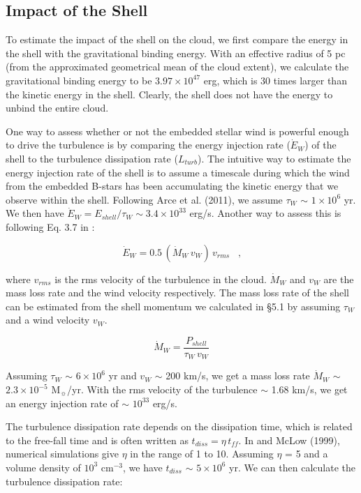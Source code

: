 \documentclass[11pt,a4paper]{emulateapj}
\begin{document}
\subsection{Impact of the Shell}
To estimate the impact of the shell on the cloud, we first compare the energy in the shell with the gravitational binding energy. With an effective radius of 5 pc (from the approximated geometrical mean of the cloud extent), we calculate the gravitational binding energy to be $3.97\times10^{47}$ erg, which is 30 times larger than the kinetic energy in the shell. Clearly, the shell does not have the energy to unbind the entire cloud.

One way to assess whether or not the embedded stellar wind is powerful enough to drive the turbulence is by comparing the energy injection rate ($\dot E_W$) of the shell to the turbulence dissipation rate ($L_{turb}$). The intuitive way to estimate the energy injection rate of the shell is to assume a timescale during which the wind from the embedded B-stars has been accumulating the kinetic energy that we observe within the shell. Following Arce et al. (2011), we assume $\tau_W$ $\sim$ $1\times10^6$ yr. We then have $\dot E_W = E_{shell}/\tau_W \sim 3.4\times10^{33}$ erg/s. Another way to assess this is following Eq. 3.7 in \citet{McKee_1989}:

\begin{equation}
\dot E_W = 0.5\,(\dot M_W\,v_W)\,v_{rms}\;\;\;\text{,}
\end{equation}

where $v_{rms}$ is the rms velocity of the turbulence in the cloud. $\dot M_W$ and $v_W$ are the mass loss rate and the wind velocity respectively. The mass loss rate of the shell can be estimated from the shell momentum we calculated in \S5.1 by assuming $\tau_W$ and a wind velocity $v_W$.

\begin{equation}
\dot M_W = \frac{P_{shell}}{\tau_W\,v_W}
\end{equation}

Assuming $\tau_W$ $\sim$ $6\times10^6$ yr and $v_W$ $\sim$ 200 km/s, we get a mass loss rate $\dot M_W$ $\sim$ $2.3\times10^{-5}$ M$_{\sun}$/yr. With the rms velocity of the turbulence $\sim$ 1.68 km/s, we get an energy injection rate of $\sim$ $10^{33}$ erg/s.

The turbulence dissipation rate depends on the dissipation time, which is related to the free-fall time and is often written as $t_{diss} = \eta\,t_{ff}$. In \citet{McKee_1989} and McLow (1999), numerical simulations give $\eta$ in the range of 1 to 10. Assuming $\eta$ = 5 and a volume density of $10^3$ cm$^{-3}$, we have $t_{diss}$ $\sim$ $5\times10^6$ yr. We can then calculate the turbulence dissipation rate:
\end{document}
